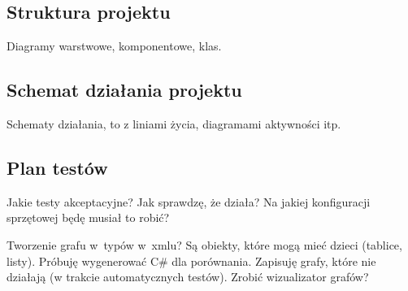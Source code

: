 \subsection{Struktura projektu}
Diagramy warstwowe, komponentowe, klas.



\subsection{Schemat działania projektu}
Schematy działania, to z liniami życia, diagramami aktywności itp.


\subsection{Plan testów}
Jakie testy akceptacyjne? Jak sprawdzę, że działa? Na jakiej konfiguracji sprzętowej będę musiał to robić?

Tworzenie grafu w~typów w~xmlu? Są obiekty, które mogą mieć dzieci (tablice, listy). Próbuję wygenerować C\# dla porównania. Zapisuję grafy, które nie działają (w trakcie automatycznych testów). Zrobić wizualizator grafów?


%
%
%
%
%
%
%
%
%
%




